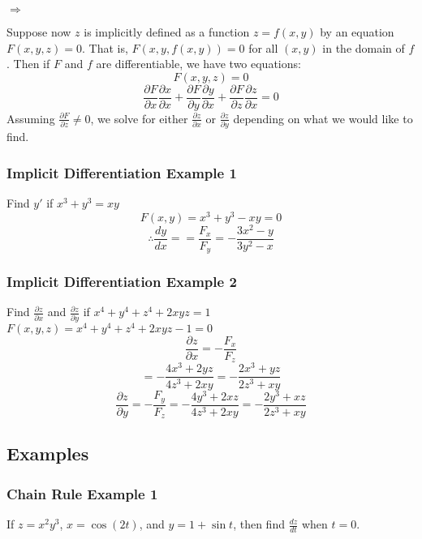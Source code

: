 \documentclass[12pt]{article}
\begin{document}
\(\Rightarrow\) 
\indent \fbox{
	\begin{minipage}{1.5in}
		\[
			\frac{dy}{dx} = \frac{-\frac{\partial F}{\partial x} }{\frac{\partial F}{\partial y} } = -\frac{F_x}{F_y}
		\]
	\end{minipage}
}

Suppose now \(z\) is implicitly defined as a function \(z=f(x,y)\) by an equation \(F(x,y,z) = 0\). That is, \(F(x, y, f(x,y)) = 0\) for all \((x,y)\) in the domain of \(f\). Then if \(F\) and \(f\) are differentiable, we have two equations:
\[
	F(x,y,z) = 0
\]
\[
	\frac{\partial F}{\partial x} \frac{\partial x}{\partial x} + \frac{\partial F}{\partial y} \frac{\partial y}{\partial x} + \frac{\partial F}{\partial z} \frac{\partial z}{\partial x} = 0
\]
Assuming \(\frac{\partial F}{\partial z} \neq 0\), we solve for either \(\frac{\partial z}{\partial x}\)  or \(\frac{\partial z}{\partial y}\) depending on what we would like to find.

\fbox{
	\begin{minipage}{2in}
		\[
			\frac{\partial z}{\partial x} -\frac{\frac{\partial F}{\partial x} }{\frac{\partial F}{\partial z} } \qquad  \frac{\partial z}{\partial y} = -\frac{\frac{\partial F}{\partial y} }{\frac{\partial F}{\partial z} }
		\]
	\end{minipage}
}
\subsubsection{Implicit Differentiation Example 1}
Find \(y'\) if \(x^3 + y^3 = xy\)
\[
	F(x,y) = x^3 + y^3 - xy  = 0
\]
\[
	\therefore \frac{dy}{dx} = =\frac{F_x}{F_y} = -\frac{3x^2 - y}{3y^2 - x}
\]

\subsubsection{Implicit Differentiation Example 2}
Find \(\frac{\partial z}{\partial x} \) and \(\frac{\partial z}{\partial y} \) if \(x^4 + y^4 + z^4 + 2xyz = 1\)\\
\(F(x,y,z) = x^4 + y^4 + z^4 + 2xyz -1 = 0\)
\[
	\frac{\partial z}{\partial x}  = -\frac{F_x}{F_z}
\]
\[
 	= -\frac{4x^3 + 2yz}{4z^3 + 2xy} = -\frac{2x^3 + yz}{2z^3 + xy}
\]
\[
	\frac{\partial z}{\partial y}  = -\frac{F_y}{F_z} = -\frac{4y^3 + 2xz}{4z^3 + 2xy} = -\frac{2y^3 + xz}{2z^3 + xy}
\]
\subsection{Examples}
\subsubsection{Chain Rule Example 1}
If \(z=x^2y^3\), \(x=\cos(2t)\), and \(y=1+\sin t\), then find \(\frac{dz}{dt}\) when \(t=0\).
\end{document}
